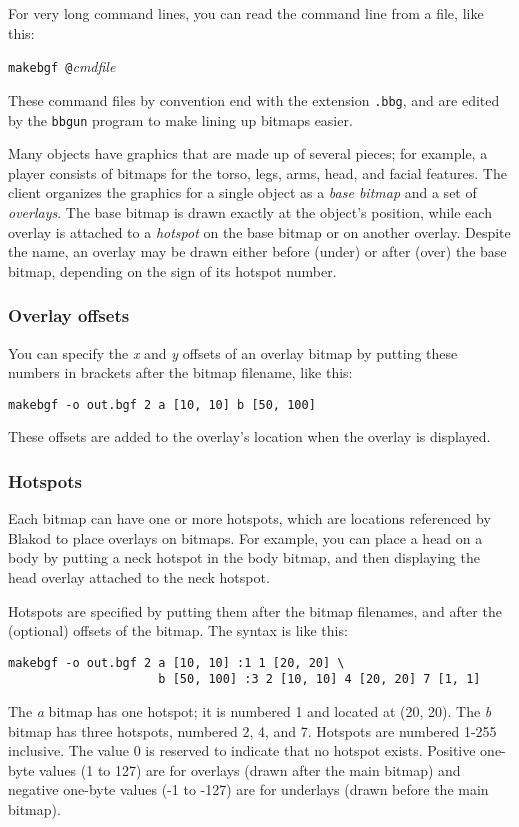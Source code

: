 For very long command lines, you can read the command line from a file, 
like this:

{\tt makebgf  @}{\em cmdfile}

\noindent
These command files by convention end with the extension {\tt .bbg},
and are edited by the {\tt bbgun} program to make lining up bitmaps
easier.

Many objects have graphics that are made up of several pieces; for
example, a player consists of bitmaps for the torso, legs, arms, head,
and facial features.  The client organizes the graphics for a single
object as a {\em base bitmap} and a set of {\em overlays}.  The base
bitmap is drawn exactly at the object's position, while each overlay
is attached to a {\em hotspot} on the base bitmap or on another
overlay.  Despite the name, an overlay may be drawn either before
(under) or after (over) the base bitmap, depending on the sign of its
hotspot number.

\subsubsection{Overlay offsets}

You can specify the {\em x} and {\em y} offsets of an overlay bitmap by putting
these numbers in brackets after the bitmap filename, like this:

\begin{verbatim}
makebgf -o out.bgf 2 a [10, 10] b [50, 100]
\end{verbatim}
\noindent
These offsets are added to the overlay's location when the overlay is
displayed.

\subsubsection{Hotspots}

Each bitmap can have one or more hotspots, which are locations
referenced by Blakod to place overlays on bitmaps.  For example, you
can place a head on a body by putting a neck hotspot in the body
bitmap, and then displaying the head overlay attached to the neck
hotspot.

Hotspots are specified by putting them after the bitmap filenames, and
after the (optional) offsets of the bitmap.  The syntax is like this:

\begin{verbatim}
makebgf -o out.bgf 2 a [10, 10] :1 1 [20, 20] \
                     b [50, 100] :3 2 [10, 10] 4 [20, 20] 7 [1, 1]
\end{verbatim}
\noindent
The {\em a} bitmap has one hotspot; it is numbered 1 and located at (20,
20).  The {\em b} bitmap has three hotspots, numbered 2, 4, and 7.
Hotspots are numbered 1-255 inclusive. The value 0 is reserved to
indicate that no hotspot exists.  Positive one-byte values (1 to 127) are
for overlays (drawn after the main bitmap) and negative one-byte
values (-1 to -127) are for underlays (drawn before the main bitmap).

